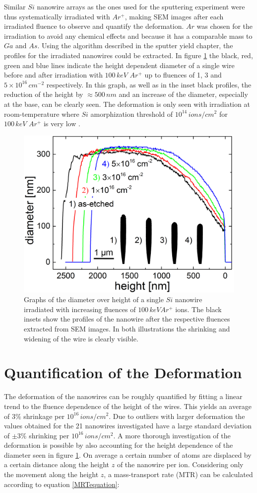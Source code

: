 Similar $Si$ nanowire arrays as the ones used for the sputtering experiment were thus systematically irradiated with $Ar^+$, making SEM images after each irradiated fluence to observe and quantify the deformation. $Ar$ was chosen for the irradiation to avoid any chemical effects and because it has a comparable mass to $Ga$ and $As$. Using the algorithm described in the sputter yield chapter, the profiles for the irradiated nanowires could be extracted. In figure \ref{deformationprofile} the black, red, green and blue lines indicate the height dependent diameter of a single wire before and after irradiation with $100\,keV\,\,Ar^+$ up to fluences of 1, 3 and $5 \times 10^{16}\,cm^{-2}$ respectively. In this graph, as well as in the inset black profiles, the reduction of the height by $\approx 500\,nm$ and an increase of the diameter, especially at the base, can be clearly seen. The deformation is only seen with irradiation at room-temperature where $Si$ amorphization threshold of $10^{14}\,ions/cm^2$ for $100\,keV\,\,Ar^+$ is very low \cite{pelaz_ion-beam-induced_2004}.

\begin{figure}
	\centering
		\includegraphics[width=.48\textwidth]{images/deformationprofile.jpg}
	\caption{Graphs of the diameter over height of a single $Si$ nanowire irradiated with increasing fluences of $100\,keV Ar^+$ ions. The black insets show the profiles of the nanowire after the respective fluences extracted from SEM images. In both illustrations the shrinking and widening of the wire is clearly visible.} 
	\label{deformationprofile}
\end{figure}

\section{Quantification of the Deformation}
\label{sec:quantifydeformation}

The deformation of the nanowires can be roughly quantified by fitting a linear trend to the fluence dependence of the height of the wires. This yields an average of $3\%$ shrinkage per $10^{16}\,ions/cm^2$. Due to outliers with larger deformation the values obtained for the 21 nanowires investigated have a large standard deviation of $\pm 3\%$ shrinking per $10^{16}\,ions/cm^2$. A more thorough investigation of the deformation is possible by also accounting for the height dependence of the diameter seen in figure \ref{deformationprofile}. On average a certain number of atoms are displaced by a certain distance along the height $z$ of the nanowire per ion. Considering only the movement along the height $z$, a mass-transport rate (MTR) can be calculated according to equation \ref{MRTequation}:

